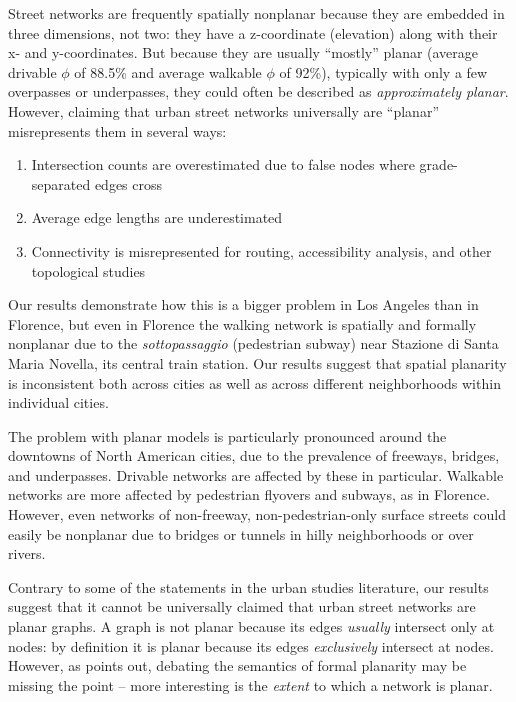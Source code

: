 \documentclass[Afour,sageh,times]{sagej}
\begin{document}
Street networks are frequently spatially nonplanar because they are embedded in three dimensions, not two: they have a z-coordinate (elevation) along with their x- and y-coordinates. But because they are usually \enquote{mostly} planar (average drivable $\phi$ of 88.5\% and average walkable $\phi$ of 92\%), typically with only a few overpasses or underpasses, they could often be described as \emph{approximately planar}. However, claiming that urban street networks universally are \enquote{planar} misrepresents them in several ways:

\begin{enumerate}
	\item{Intersection counts are overestimated due to false nodes where grade-separated edges cross}
	\item{Average edge lengths are underestimated}
	\item{Connectivity is misrepresented for routing, accessibility analysis, and other topological studies}
\end{enumerate}

Our results demonstrate how this is a bigger problem in Los Angeles than in Florence, but even in Florence the walking network is spatially and formally nonplanar due to the \textit{sottopassaggio} (pedestrian subway) near Stazione di Santa Maria Novella, its central train station. Our results suggest that spatial planarity is inconsistent both across cities as well as across different neighborhoods within individual cities.

The problem with planar models is particularly pronounced around the downtowns of North American cities, due to the prevalence of freeways, bridges, and underpasses. Drivable networks are affected by these in particular. Walkable networks are more affected by pedestrian flyovers and subways, as in Florence. However, even networks of non-freeway, non-pedestrian-only surface streets could easily be nonplanar due to bridges or tunnels in hilly neighborhoods or over rivers.

Contrary to some of the statements in the urban studies literature, our results suggest that it cannot be universally claimed that urban street networks are planar graphs. A graph is not planar because its edges \emph{usually} intersect only at nodes: by definition it is planar because its edges \emph{exclusively} intersect at nodes. However, as \citet{newman_networks:_2010} points out, debating the semantics of formal planarity may be missing the point -- more interesting is the \emph{extent} to which a network is planar.
\end{document}
